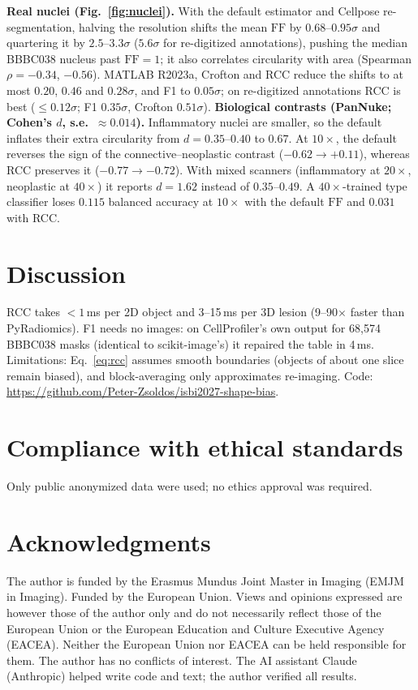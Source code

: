 \documentclass{article}
\newcommand{\ff}{\mathrm{FF}}
\begin{document}
\noindent\textbf{Real nuclei (Fig.~\ref{fig:nuclei}).} With the default estimator and Cellpose re-segmentation, halving the resolution shifts the mean $\ff$ by $0.68$--$0.95\sigma$ and quartering it by $2.5$--$3.3\sigma$ ($5.6\sigma$ for re-digitized annotations), pushing the median BBBC038 nucleus past $\ff=1$; it also correlates circularity with area (Spearman $\rho=-0.34$, $-0.56$). MATLAB R2023a, Crofton and RCC reduce the shifts to at most $0.20$, $0.46$ and $0.28\sigma$, and F1 to $0.05\sigma$; on re-digitized annotations RCC is best (${\le}0.12\sigma$; F1 $0.35\sigma$, Crofton $0.51\sigma$).
\noindent\textbf{Biological contrasts (PanNuke; Cohen's $d$, s.e.\ ${\approx}0.014$).} Inflammatory nuclei are smaller, so the default inflates their extra circularity from $d=0.35$--$0.40$ to $0.67$. At $10\times$, the default reverses the sign of the connective--neoplastic contrast ($-0.62\to+0.11$), whereas RCC preserves it ($-0.77\to-0.72$). With mixed scanners (inflammatory at $20\times$, neoplastic at $40\times$) it reports $d=1.62$ instead of $0.35$--$0.49$. A $40\times$-trained type classifier loses $0.115$ balanced accuracy at $10\times$ with the default $\ff$ and $0.031$ with RCC.

\section{Discussion}
\label{sec:disc}
RCC takes ${<}1$\,ms per 2D object and 3--15\,ms per 3D lesion (9--90$\times$ faster than PyRadiomics). F1 needs no images: on CellProfiler's own output for 68{,}574 BBBC038 masks (identical to scikit-image's) it repaired the table in 4\,ms. Limitations: Eq.~\eqref{eq:rcc} assumes smooth boundaries (objects of about one slice remain biased), and block-averaging only approximates re-imaging. Code: \url{https://github.com/Peter-Zsoldos/isbi2027-shape-bias}.

\section{Compliance with ethical standards}
Only public anonymized data were used; no ethics approval was required.

\section{Acknowledgments}
The author is funded by the Erasmus Mundus Joint Master in Imaging (EMJM in Imaging). Funded by the European Union. Views and opinions expressed are however those of the author only and do not necessarily reflect those of the European Union or the European Education and Culture Executive Agency (EACEA). Neither the European Union nor EACEA can be held responsible for them. The author has no conflicts of interest. The AI assistant Claude (Anthropic) helped write code and text; the author verified all results.



\end{document}
